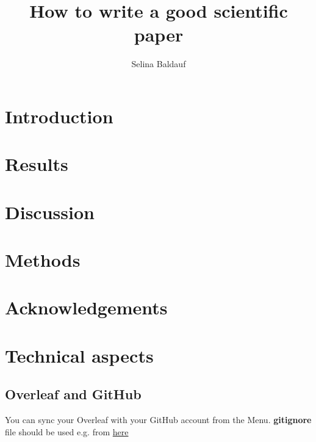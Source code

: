 \documentclass[fleqn,10pt]{wlscirep}
\title{How to write a good scientific paper}
\author[1,*]{Selina Baldauf}
\affil[1]{FU Berlin}
\begin{document}
\flushbottom
\maketitle

\thispagestyle{empty}



\section*{Introduction}



\section*{Results}




\section*{Discussion}


\section*{Methods}




\section*{Acknowledgements}

\section*{Technical aspects}
\subsection{Overleaf and GitHub}
You can sync your Overleaf with your GitHub account from the Menu.
\textbf{gitignore} file should be used e.g. from \href{https://github.com/github/gitignore/blob/master/TeX.gitignore}{here} 
\end{document}
